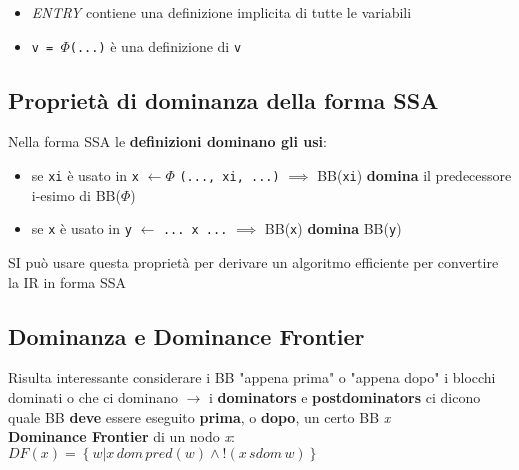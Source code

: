 \begin{emphasize}[frametitle={Note}]
  \begin{itemize}
    \item\textit{ENTRY} contiene una definizione implicita di tutte le variabili
    \item\lstinline|v = |$\Phi$\lstinline|(...)| \`e una definizione di \lstinline|v|
  \end{itemize}
\end{emphasize}

\subsection{Propriet\`a di dominanza della forma SSA}

Nella forma SSA le \textbf{definizioni dominano gli usi}:
\begin{itemize}
  \item se \lstinline|xi| \`e usato in \lstinline|x| $\leftarrow \Phi$ \lstinline|(..., xi, ...)| $\implies$ BB(\lstinline|xi|) \textbf{domina} il predecessore i-esimo di BB($\Phi$)
  \item se \lstinline|x| \`e usato in \lstinline|y| $\leftarrow$ \lstinline|... x ...| $\implies$ BB(\lstinline|x|) \textbf{domina} BB(\lstinline|y|)
\end{itemize}

SI pu\`o usare questa propriet\`a per derivare un algoritmo efficiente per convertire la IR in forma SSA

\subsection{Dominanza e Dominance Frontier}

Risulta interessante considerare i BB "appena prima" o "appena dopo" i blocchi dominati o che ci dominano $\rightarrow$ i \textbf{dominators} e \textbf{postdominators} ci dicono quale BB \textbf{deve} essere eseguito \textbf{prima}, o \textbf{dopo}, un certo BB \textit{x}\\

\noindent\textbf{Dominance Frontier} di un nodo \textit{x}: $\boxed{DF(x) = \left\lbrace w | x\, dom\, pred(w) \land !(x\, sdom\, w)\right\rbrace}$

